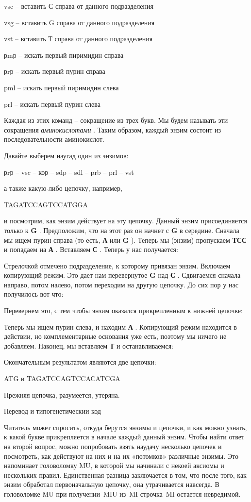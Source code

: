 \documentclass[../main.tex]{subfiles}
\begin{document}
vsc \--- вставить С справа от данного подразделения

vsg \--- вставить G справа от данного подразделения

vst \--- вставить Т справа от данного подразделения

рmр \--- искать первый пиримидин справа

рrр \--- искать первый пурин справа

pml \--- искать первый пиримидин слева

prl \--- искать первый пурин слева

Каждая из этих команд \--- сокращение из трех букв. Мы будем называть эти сокращения \emph{аминокислотами} . Таким образом, каждый энзим состоит из последовательности аминокислот.

Давайте выберем наугад один из энзимов:

рrр \--- vsc \--- кор \--- sdp \--- sdl \--- prb \--- prl \--- vst

а также какую-либо цепочку, например,

TAGATCCAGTCCATGGA

и посмотрим, как энзим действует на эту цепочку. Данный энзим присоединяется только к \textbf{G} . Предположим, что на этот раз он начнет с \textbf{G} в середине. Сначала мы ищем пурин справа (то есть, \textbf{А} или \textbf{G} ). Теперь мы (энзим) пропускаем \textbf{ТСС} и попадаем на \textbf{А} . Вставляем \textbf{С} . Теперь у нас получается:

Стрелочкой отмечено подразделение, к которому привязан энзим. Включаем копирующий режим. Это дает нам перевернутое \textbf{G} над \textbf{С} . Сдвигаемся сначала направо, потом налево, потом переходим на другую цепочку. До сих пор у нас получилось вот что:

Перевернем это, с тем чтобы энзим оказался прикрепленным к нижней цепочке:

Теперь мы ищем пурин слева, и находим \textbf{А} . Копирующий режим находится в действии, но комплементарные основания уже есть, поэтому мы ничего не добавляем. Наконец, мы вставляем \textbf{Т} и останавливаемся:

Окончательным результатом являются две цепочки:

ATG и TAGATCCAGTCCACATCGA

Прежняя цепочка, разумеется, утеряна.

Перевод и типогенетическии код

Читатель может спросить, откуда берутся энзимы и цепочки, и как можно узнать, к какой букве прикрепляется в начале каждый данный энзим. Чтобы найти ответ на второй вопрос, можно попробовать взять наудачу несколько цепочек и посмотреть, как действуют на них и на их «потомков» различные энзимы. Это напоминает головоломку MU, в которой мы начинали с некоей аксиомы и нескольких правил. Единственная разница заключается в том, что после того, как энзим обработал первоначальную цепочку, она утрачивается навсегда. В головоломке MU при получении~MIU из~MI строчка~MI остается невредимой.
\end{document}
